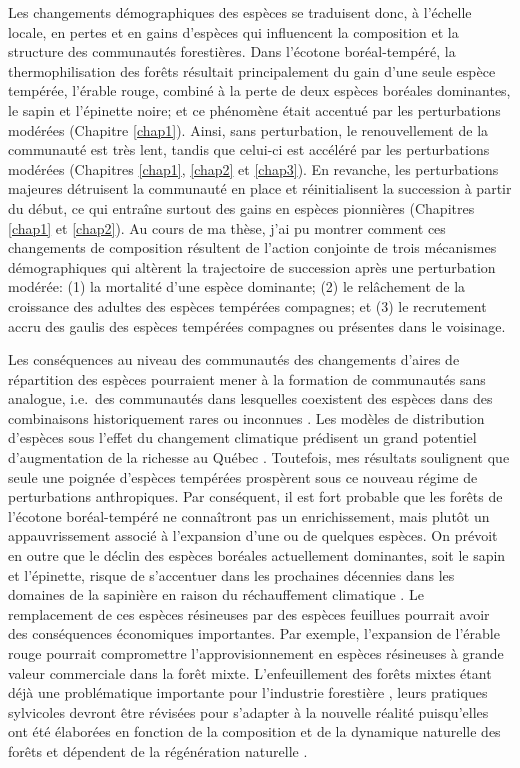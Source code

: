 Les changements démographiques des espèces se traduisent donc, à
l'échelle locale, en pertes et en gains d'espèces qui influencent la
composition et la structure des communautés forestières. Dans l'écotone
boréal-tempéré, la thermophilisation des forêts résultait principalement
du gain d'une seule espèce tempérée, l'érable rouge, combiné à la perte
de deux espèces boréales dominantes, le sapin et l'épinette noire; et ce
phénomène était accentué par les perturbations modérées (Chapitre
\ref{chap1}). Ainsi, sans perturbation, le renouvellement de la
communauté est très lent, tandis que celui-ci est accéléré par les
perturbations modérées (Chapitres \ref{chap1}, \ref{chap2} et
\ref{chap3}). En revanche, les perturbations majeures détruisent la
communauté en place et réinitialisent la succession à partir du début,
ce qui entraîne surtout des gains en espèces pionnières (Chapitres
\ref{chap1} et \ref{chap2}). Au cours de ma thèse, j'ai pu montrer
comment ces changements de composition résultent de l'action conjointe
de trois mécanismes démographiques qui altèrent la trajectoire de
succession après une perturbation modérée: (1) la mortalité d'une espèce
dominante; (2) le relâchement de la croissance des adultes des espèces
tempérées compagnes; et (3) le recrutement accru des gaulis des espèces
tempérées compagnes ou présentes dans le voisinage.

Les conséquences au niveau des communautés des changements d'aires de
répartition des espèces pourraient mener à la formation de communautés
sans analogue, i.e.~des communautés dans lesquelles coexistent des
espèces dans des combinaisons historiquement rares ou inconnues
\citep{williams_novel_2007}. Les modèles de distribution d'espèces sous
l'effet du changement climatique prédisent un grand potentiel
d'augmentation de la richesse au Québec
\citep{berteaux_changements_2014}. Toutefois, mes résultats soulignent
que seule une poignée d'espèces tempérées prospèrent sous ce nouveau
régime de perturbations anthropiques. Par conséquent, il est fort
probable que les forêts de l'écotone boréal-tempéré ne connaîtront pas
un enrichissement, mais plutôt un appauvrissement associé à l'expansion
d'une ou de quelques espèces. On prévoit en outre que le déclin des
espèces boréales actuellement dominantes, soit le sapin et l'épinette,
risque de s'accentuer dans les prochaines décennies dans les domaines de
la sapinière en raison du réchauffement climatique
\citep{dorangeville_beneficial_2018}. Le remplacement de ces espèces
résineuses par des espèces feuillues pourrait avoir des conséquences
économiques importantes. Par exemple, l'expansion de l'érable rouge
pourrait compromettre l'approvisionnement en espèces résineuses à grande
valeur commerciale dans la forêt mixte. L'enfeuillement des forêts
mixtes étant déjà une problématique importante pour l'industrie
forestière \citep{grondin_les_2003}, leurs pratiques sylvicoles devront
être révisées pour s'adapter à la nouvelle réalité puisqu'elles ont été
élaborées en fonction de la composition et de la dynamique naturelle des
forêts et dépendent de la régénération naturelle
\citep{pinna_amenagement_2009}.

